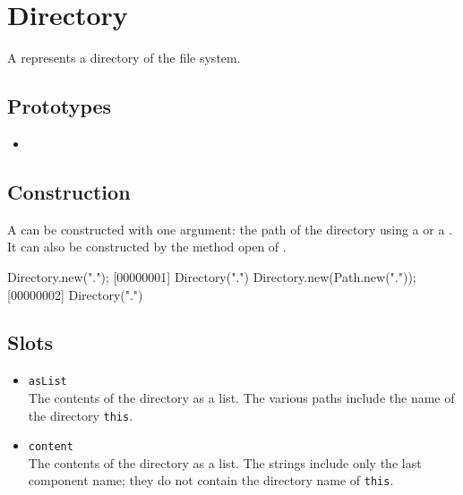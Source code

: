 \section{Directory}

A  represents a directory of the file system.

\subsection{Prototypes}
\begin{itemize}
\item {}
\end{itemize}

\subsection{Construction}

A  can be constructed with one argument: the path of
the directory using a  or a . It can
also be constructed by the method open of .

\begin{urbiscript}[firstnumber=1]
Directory.new(".");
[00000001] Directory(".")
Directory.new(Path.new("."));
[00000002] Directory(".")
\end{urbiscript}

\subsection{Slots}
\begin{itemize}
\item \lstinline|asList|\\
  The contents of the directory as a  list.  The
  various paths include the name of the directory \lstinline|this|.

\item \lstinline|content|\\
  The contents of the directory as a  list.  The
  strings include only the last component name; they do not contain
  the directory name of \lstinline|this|.
\end{itemize}


